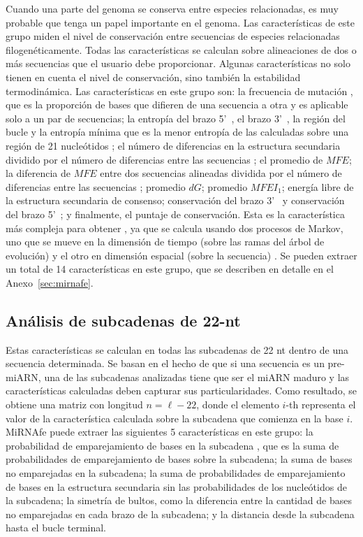 Cuando una parte del genoma se conserva entre especies relacionadas, es muy probable que tenga un papel importante en el genoma. Las características de este
grupo miden el nivel de conservación entre secuencias de especies relacionadas filogenéticamente. Todas las características se calculan sobre alineaciones
de dos o más secuencias que el usuario debe proporcionar. Algunas características no solo tienen en cuenta el nivel de conservación, sino también la
estabilidad termodinámica. Las características en este grupo son: la frecuencia de mutación \citep{huang2007mirfinder}, que es la proporción de bases que difieren de
una secuencia a otra y es aplicable solo a un par de secuencias; la entropía del brazo 5\textquoteright~, el brazo 3\textquoteright~, la región del bucle y
la entropía mínima que es la menor entropía de las calculadas sobre una región de 21 nucleótidos \citep{hertel2006hairpins}; el número de diferencias en la
estructura secundaria dividido por el número de diferencias entre las secuencias \citep{huang2007mirfinder}; el promedio de $MFE$; la diferencia de $MFE$ entre dos
secuencias alineadas dividida por el número de diferencias entre las secuencias \citep{huang2007mirfinder}; promedio $dG$; promedio $ MFEI_{1} $; energía libre de la
estructura secundaria de consenso; conservación del brazo 3\textquoteright~ y conservación del brazo 5\textquoteright~; y finalmente, el puntaje de
conservación. Esta es la característica más compleja para obtener \citep{terai2007mirrim}, ya que se calcula usando dos procesos de Markov, uno que se mueve en la
dimensión de tiempo (sobre las ramas del árbol de evolución) y el otro en dimensión espacial (sobre la secuencia) . Se pueden extraer un total de 14
características en este grupo, que se describen en detalle en el Anexo~\ref{sec:mirnafe}.

\subsection{Análisis de subcadenas de 22-nt}

Estas características se calculan en todas las subcadenas de 22 nt dentro de una secuencia determinada. Se basan en el hecho de que si una secuencia es un
pre-miARN, una de las subcadenas analizadas tiene que ser el miARN maduro y las características calculadas deben capturar sus particularidades. Como
resultado, se obtiene una matriz con longitud $ n = \ell - 22 $, donde el elemento $i$-th representa el valor de la característica calculada sobre la
subcadena que comienza en la base $i$. MiRNAfe puede extraer las siguientes 5 características en este grupo: la probabilidad de emparejamiento de bases en la
subcadena \citep{lim2003}, que es la suma de probabilidades de emparejamiento de bases sobre la subcadena; la suma de bases no emparejadas en la subcadena; la
suma de probabilidades de emparejamiento de bases en la estructura secundaria sin las probabilidades de los nucleótidos de la subcadena; la simetría de
bultos, como la diferencia entre la cantidad de bases no emparejadas en cada brazo de la subcadena; y la distancia desde la subcadena hasta el bucle terminal.

